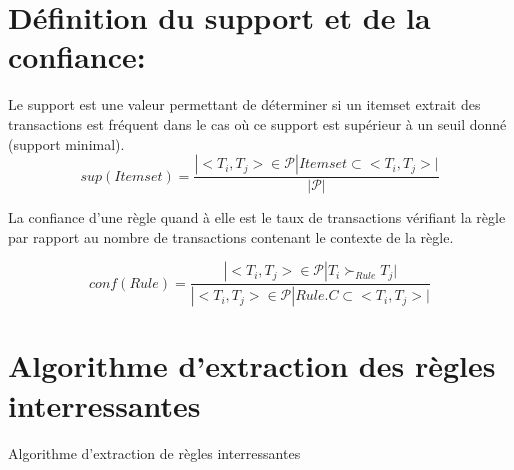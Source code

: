 \documentclass[a4paper]{article}
\begin{document}
\section{Définition du support et de la confiance:}
Le support est une valeur permettant de déterminer si un itemset extrait des transactions est fréquent dans le cas où ce support est supérieur à un seuil donné (support minimal). \\
\[sup(Itemset)=\frac{|<T_{i},T_{j}>\in \mathcal{P}|Itemset\subset <T_{i},T_{j}>|}{|\mathcal{P}|}\]

La confiance d'une règle quand à elle est le taux de transactions vérifiant la règle par rapport au nombre de transactions contenant le contexte de la règle.

\[
	conf(Rule)=\frac{|<T_{i},T_{j}>\in \mathcal{P}|T_{i}\succ_{Rule} T_{j}|}{|<T_{i},T_{j}>\in \mathcal{P}|Rule.C\subset <T_{i},T_{j}>|}
\]


\section{Algorithme d'extraction des règles interressantes}

\begin{algorithm}[H]


	
	\caption{Algorithme d'extraction de règles interressantes}
\end{algorithm}
\end{document}
